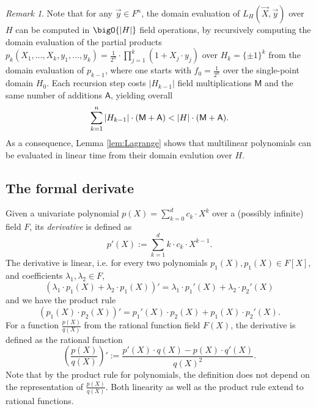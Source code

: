 \documentclass[11pt]{article}
\theoremstyle{definition}
\theoremstyle{remark}
\newtheorem{rem}[thm]{Remark}
\begin{document}
\begin{rem}
\label{rem:Lagrange}
Note that for any $\vec y\in F^n$, the domain evaluation of $L_H(\vec X, \vec y)$ over $H$ can be computed in 
$\bigO{|H|}$ field operations, by recursively computing the domain evaluation of the partial products $p_k(X_1,\ldots, X_k, y_1,\ldots, y_k)= \frac{1}{2^n}\cdot \prod_{j=1}^k (1 + X_j\cdot y_j)$ over $H_k =\{\pm 1\}^k$ from the domain evaluation of $p_{k-1}$, where one starts with $f_0 = \frac{1}{2^n}$ over the single-point domain $H_0$.
Each recursion step costs $|H_{k-1}|$ field multiplications $\mathsf M$ and the same number of additions $\mathsf A$,  
yielding overall
\begin{equation*}
\sum_{k=1}^{n} |H_{k-1}| \cdot (\textsf M + \textsf A) < |H| \cdot  (\textsf M + \textsf A).
\end{equation*}
As a consequence, Lemma \ref{lem:Lagrange} shows that multilinear polynomials can be evaluated in linear time from their domain evalution over $H$.
\end{rem}



\subsection{The formal derivate}

Given a univariate polynomial $p(X) =\sum_{k=0}^{d} c_k\cdot X^k$ over a (possibly infinite) field $F$, its \textit{derivative} is defined as 
\begin{equation}
\label{e:DerivativePoly}
p'(X) := \sum_{k=1}^{d} k \cdot c_k \cdot X^{k-1}.
\end{equation}
The derivative is linear, i.e. for every two polynomials $p_1(X), p_1(X)\in F[X]$, and coefficients $\lambda_1,\lambda_2\in F$,
\begin{equation}
\label{e:DerivativeLinear}
(\lambda_1 \cdot p_1(X) + \lambda_2 \cdot p_1(X))' = \lambda_1\cdot p_1'(X) + \lambda_2\cdot p_2'(X)
\end{equation}
 and we have the product rule
\begin{equation}
\label{e:ProductRule}
(p_1(X)\cdot p_2(X))' = p_1'(X)\cdot p_2(X) + p_1(X)\cdot p_2'(X).
\end{equation}
For a function $\frac{p(X)}{q(X)}$ from the rational function field $F(X)$, the derivative is defined as the rational function
\begin{equation}
\label{e:DerivativeQuotient}
\left(\frac{p(X)}{q(X)}\right)' := \frac{p'(X)\cdot q(X) - p(X)\cdot q'(X)}{q(X)^2}.
\end{equation}
Note that by the product rule for polynomials, the definition does not depend on the representation of $\frac{p(X)}{q(X)}$.
Both linearity as well as the product rule extend to rational functions. 
\end{document}
